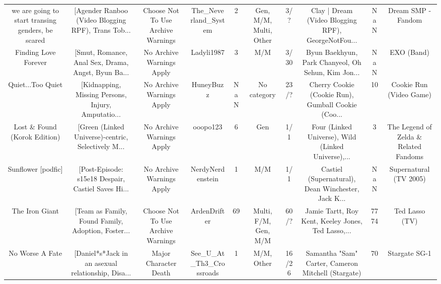 \begin{table}[h!]
{\begin{tabular}{|c|c|c|c|c|c|c|c|c|c|}
 we are going to start transing genders, be scared & [Agender Ranboo (Video Blogging RPF), Trans Tob... &                 Choose Not To Use Archive Warnings &               The\_Neverland\_System &         2 &           Gen, M/M, Multi, Other &      3/? & Clay | Dream (Video Blogging RPF), GeorgeNotFou... &      NaN &                                 Dream SMP - Fandom \\
                              Finding Love Forever & [Smut, Romance, Anal Sex, Drama, Angst, Byun Ba... &                          No Archive Warnings Apply &                         Ladyli1987 &         3 &                              M/M &     3/30 & Byun Baekhyun, Park Chanyeol, Oh Sehun, Kim Jon... &      NaN &                                         EXO (Band) \\
                                 Quiet...Too Quiet & [Kidnapping, Missing Persons, Injury, Amputatio... &                          No Archive Warnings Apply &                          HuneyBuzz &       NaN &                      No category &     23/? & Cherry Cookie (Cookie Run), Gumball Cookie (Coo... &       10 &                            Cookie Run (Video Game) \\
                      Lost \& Found (Korok Edition) & [Green (Linked Universe)-centric, Selectively M... &                          No Archive Warnings Apply &                           ooopo123 &         6 &                              Gen &      1/1 & Four (Linked Universe), Wild (Linked Universe),... &        3 &              The Legend of Zelda \& Related Fandoms \\
                                Sunflower [podfic] & [Post-Episode: s15e18 Despair, Castiel Saves Hi... &                          No Archive Warnings Apply &                   NerdyNerdenstein &         1 &                              M/M &      1/1 & Castiel (Supernatural), Dean Winchester, Jack K... &      NaN &                             Supernatural (TV 2005) \\
                                    The Iron Giant & [Team as Family, Found Family, Adoption, Foster... &                 Choose Not To Use Archive Warnings &                       ArdenDrifter &        69 &             Multi, F/M, Gen, M/M &     60/? & Jamie Tartt, Roy Kent, Keeley Jones, Ted Lasso,... &     7774 &                                     Ted Lasso (TV) \\
                                   No Worse A Fate & [Daniel*s*Jack in an asexual relationship, Disa... &                              Major Character Death &            See\_U\_At\_Th3\_Crossroads &         1 &                       M/M, Other &    16/26 & Samantha "Sam" Carter, Cameron Mitchell (Stargate) &       70 &                                      Stargate SG-1 \\

\end{tabular}}
\end{table}
